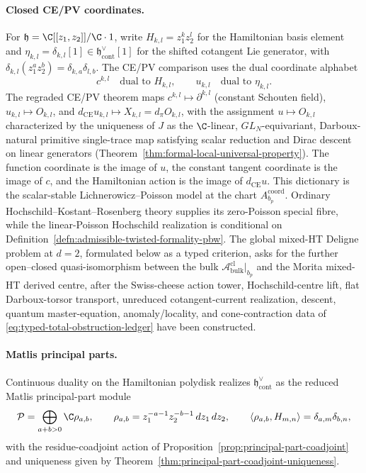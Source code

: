 \documentclass[11pt]{memoir}
\begin{document}
\paragraph{Closed CE/PV coordinates.}
For \(\mathfrak h=\C[[z_1,z_2]]/\C\cdot1\), write
\(H_{k,l}=z_1^kz_2^l\) for the Hamiltonian basis element and
\(\eta_{k,l}=\delta_{k,l}[1]\in\mathfrak h^\vee_{\mathrm{cont}}[1]\)
for the shifted cotangent Lie generator, with
\(\delta_{k,l}(z_1^az_2^b)=\delta_{k,a}\delta_{l,b}\).  The CE/PV
comparison uses the dual coordinate alphabet
\[
  c^{k,l}\quad\text{dual to }H_{k,l},
  \qquad
  u_{k,l}\quad\text{dual to }\eta_{k,l}.
\]
The regraded CE/PV theorem maps
\(c^{k,l}\mapsto\partial^{k,l}\) (constant Schouten field),
\(u_{k,l}\mapsto O_{k,l}\), and
\(d_{\mathrm{CE}}u_{k,l}\mapsto X_{k,l}=d_\pi O_{k,l}\), with the
assignment \(u\mapsto O_{k,l}\) characterized by the
uniqueness of \(J\) as the \(\C\)-linear, \(GL_N\)-equivariant,
Darboux-natural primitive single-trace map satisfying scalar reduction
and Dirac descent on linear generators
(Theorem~\ref{thm:formal-local-universal-property}).  The function
coordinate is the image of \(u\), the constant tangent coordinate is the
image of \(c\), and the Hamiltonian action is the image of
\(d_{\mathrm{CE}}u\).  This dictionary is the scalar-stable
Lichnerowicz--Poisson model at the chart
\(A^{\mathrm{coord}}_{b_p}\).  Ordinary
Hochschild--Kostant--Rosenberg theory supplies its zero-Poisson special
fibre, while the linear-Poisson Hochschild realization is conditional on
Definition~\ref{defn:admissible-twisted-formality-pbw}.  The global mixed-HT
Deligne problem at \(d=2\), formulated below as a typed criterion,
asks for the further open--closed quasi-isomorphism between the bulk
\(\mathcal A^{\mathrm{cl}}_{\mathrm{bulk}}|_{b_p}\) and the Morita
mixed-HT derived centre, after the Swiss-cheese action tower,
Hochschild-centre lift, flat Darboux-torsor transport, unreduced
cotangent-current realization, descent, quantum master-equation,
anomaly/locality, and cone-contraction data of
\eqref{eq:typed-total-obstruction-ledger} have been constructed.

\paragraph{Matlis principal parts.}
Continuous duality on the Hamiltonian polydisk realizes
\(\mathfrak h^\vee_{\mathrm{cont}}\) as the reduced Matlis principal-part
module
\[
  \mathcal P=\bigoplus_{a+b>0}\C\rho_{a,b},
  \qquad
  \rho_{a,b}=z_1^{-a-1}z_2^{-b-1}\,dz_1\,dz_2,
  \qquad
  \langle\rho_{a,b},H_{m,n}\rangle=\delta_{a,m}\delta_{b,n},
\]
with the residue-coadjoint action of
Proposition~\ref{prop:principal-part-coadjoint} and uniqueness given by
Theorem~\ref{thm:principal-part-coadjoint-uniqueness}.
\end{document}
